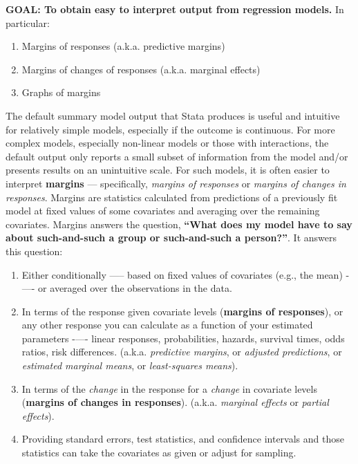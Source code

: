 \documentclass[
]{book}
\providecommand{\tightlist}{%
  \setlength{\itemsep}{0pt}\setlength{\parskip}{0pt}}
\begin{document}
\begin{alert}

\textbf{GOAL: To obtain easy to interpret output from regression models.} In particular:

\begin{enumerate}
\def\labelenumi{\arabic{enumi}.}
\tightlist
\item
  Margins of responses (a.k.a. predictive margins)
\item
  Margins of changes of responses (a.k.a. marginal effects)
\item
  Graphs of margins
\end{enumerate}

\end{alert}

The default summary model output that Stata produces is useful and intuitive for relatively simple models, especially if the outcome is continuous. For more complex models, especially non-linear models or those with interactions, the default output only reports a small subset of information from the model and/or presents results on an unintuitive scale. For such models, it is often easier to interpret \textbf{margins} --- specifically, \emph{margins of responses} or \emph{margins of changes in responses}. Margins are statistics calculated from predictions of a previously fit model at fixed values of some covariates and averaging over the remaining covariates. Margins answers the question, \textbf{``What does my model have to say about such-and-such a group or such-and-such a person?''}. It answers this question:

\begin{enumerate}
\def\labelenumi{\arabic{enumi}.}
\tightlist
\item
  Either conditionally ----- based on fixed values of covariates (e.g., the mean) -\/---- or averaged over the observations in the data.
\item
  In terms of the response given covariate levels (\textbf{margins of responses}), or any other response you can calculate as a function of your estimated parameters -\/---- linear responses, probabilities, hazards, survival times, odds ratios, risk differences. (a.k.a. \emph{predictive margins}, or \emph{adjusted predictions}, or \emph{estimated marginal means}, or \emph{least-squares means}).
\item
  In terms of the \emph{change} in the response for a \emph{change} in covariate levels (\textbf{margins of changes in responses}). (a.k.a. \emph{marginal effects} or \emph{partial effects}).
\item
  Providing standard errors, test statistics, and confidence intervals and those statistics can take the covariates as given or adjust for sampling.
\end{enumerate}
\end{document}

